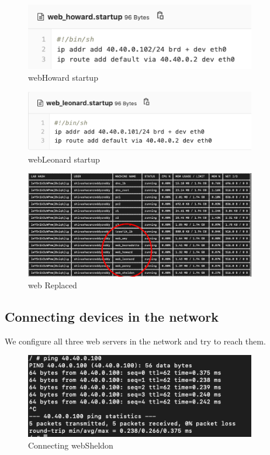 \begin{figure}[H]
\centering
  \includegraphics[width=0.9\textwidth]{Images/web_howard startup.png}
  \caption{web\textunderscore Howard startup}
  \label{fig:3.3}
\end{figure}

\begin{figure}[H]
\centering
  \includegraphics[width=0.9\textwidth]{Images/web_lenard startup.png}
  \caption{web\textunderscore Leonard startup}
  \label{fig:3.4}
\end{figure}

\begin{figure}[H]
\centering
  \includegraphics[width=0.9\textwidth]{Images/Web-1 Replaced .png}
  \caption{web Replaced}
  \label{fig:3.5}
\end{figure}


\subsection{Connecting devices in the network}
We configure all three web servers in the network and try to reach them.

\begin{figure}[H]
\centering
  \includegraphics[width=0.9\textwidth]{Images/Connecting web-sheldon.png}
  \caption{Connecting web\textunderscore Sheldon}
  \label{fig:3.6}
\end{figure}

